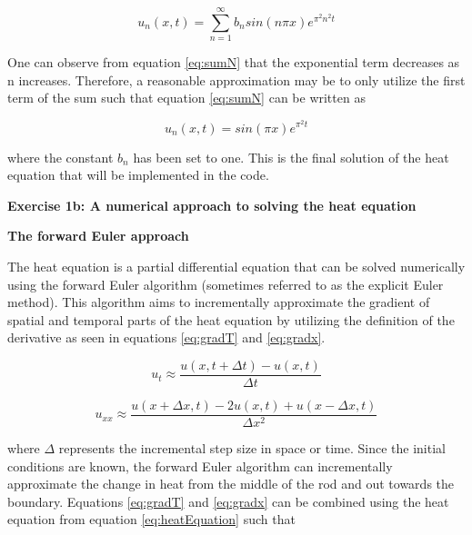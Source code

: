 \documentclass[12pt,a4paper]{article}
\begin{document}
\begin{equation}\label{eq:sumN}
u_n(x,t) = \sum_{n=1}^{\infty} b_n sin(n\pi x)e^{\pi^2 n^2 t}
\end{equation}

\noindent One can observe from equation \ref{eq:sumN} that the exponential term decreases as n increases. Therefore, a reasonable approximation may be to only utilize the first term of the sum such that equation \ref{eq:sumN} can be written as

\begin{equation}\label{eq:finalSol}
u_n(x,t) = sin(\pi x)e^{\pi^2 t}
\end{equation}

\noindent where the constant $b_n$ has been set to one. This is the final solution of the heat equation that will be implemented in the code.

\newpage

\begin{center}
\Large{\textbf{Exercise 1b: A numerical approach to solving the heat equation}}
\end{center}

\begin{center}
\large{\textbf{The forward Euler approach}}
\end{center}

\noindent The heat equation is a partial differential equation that can be solved numerically using the forward Euler algorithm (sometimes referred to as the explicit Euler method). This algorithm aims to incrementally approximate the gradient of spatial and temporal parts of the heat equation by utilizing the definition of the derivative as seen in equations \ref{eq:gradT} and \ref{eq:gradx}.

\begin{equation}\label{eq:gradT}
u_t \approx \frac{u(x, t+\Delta t) - u(x,t)}{\Delta t}
\end{equation}

\begin{equation}\label{eq:gradx}
u_{xx} \approx \frac{u(x + \Delta x, t) - 2u(x,t) + u(x-\Delta x,t)}{\Delta x^2}
\end{equation}

\noindent where $\Delta$ represents the incremental step size in space or time. Since the initial conditions are known, the forward Euler algorithm can incrementally approximate the change in heat from the middle of the rod and out towards the boundary. Equations \ref{eq:gradT} and \ref{eq:gradx} can be combined using the heat equation from equation \ref{eq:heatEquation} such that
\end{document}
